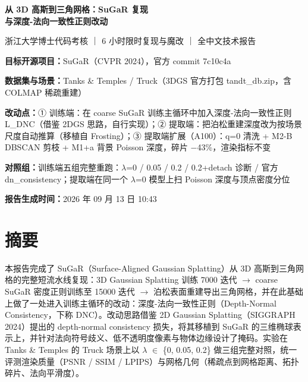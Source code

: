\documentclass[UTF8,a4paper,11pt]{ctexart}
\begin{document}
\begin{center}
{\LARGE\bfseries
从 3D 高斯到三角网格：SuGaR 复现\\
与深度-法向一致性正则改动}
\end{center}
\vspace{4pt}
浙江大学博士代码考核 ｜ 6 小时限时复现与魔改 ｜ 全中文技术报告

\textbf{目标开源项目：}SuGaR（CVPR 2024），官方 commit 7c10c4a

\textbf{数据集与场景：}Tanks \& Temples / Truck（3DGS 官方打包 tandt\_db.zip，含 COLMAP 稀疏重建）

\textbf{改动点：}① 训练端：在 coarse SuGaR 训练主循环中加入深度-法向一致性正则 L\_DNC（借鉴 2DGS 思路，自行实现）；② 提取端：把泊松重建深度改为按场景尺度自动推算（移植自 Frosting）；③ 提取端扩展（A100）：q=0 清洗 + M2-B DBSCAN 剪枝 + M1+a 背景 Poisson 深度，碎片 $-$43\%，渲染指标不变

\textbf{对照组：}训练端五组完整重跑：$\lambda$=0 / 0.05 / 0.2 / 0.2+detach 诊断 / 官方 dn\_consistency；提取端在同一个 $\lambda$=0 模型上扫 Poisson 深度与顶点密度分位

\textbf{报告生成时间：}2026 年 09 月 13 日 10:43

\begin{center}
\end{center}
\section{摘要}
本报告完成了 SuGaR（Surface-Aligned Gaussian Splatting）从 3D 高斯到三角网格的完整短流水线复现：3D Gaussian Splatting 训练 7000 迭代 $\rightarrow$ coarse SuGaR 密度正则训练至 15000 迭代 $\rightarrow$ 泊松表面重建导出三角网格，并在此基础上做了一处进入训练主循环的改动：深度-法向一致性正则（Depth-Normal Consistency，下称 DNC）。改动思路借鉴 2D Gaussian Splatting（SIGGRAPH 2024）提出的 depth-normal consistency 损失，将其移植到 SuGaR 的三维椭球表示上，并针对法向符号歧义、低不透明度像素与物体边缘设计了掩码。实验在 Tanks \& Temples 的 Truck 场景上以 $\lambda$ $\in$ \{0, 0.05, 0.2\} 做三组完整对照，统一评测渲染质量（PSNR / SSIM / LPIPS）与网格几何（稀疏点到网格距离、拓扑碎片、法向平滑度）。
\end{document}
